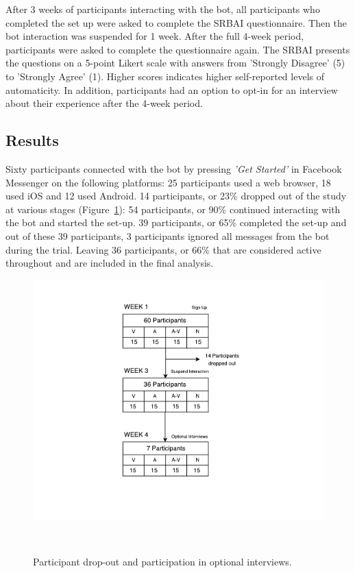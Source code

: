 After 3 weeks of participants interacting with the bot, all participants who completed the set up were asked to complete the SRBAI questionnaire. Then the bot interaction was suspended for 1 week. After the full 4-week period, participants were asked to complete the questionnaire again. The SRBAI presents the questions on a 5-point Likert scale with answers from 'Strongly Disagree' (5) to 'Strongly Agree' (1). Higher scores indicates higher self-reported levels of automaticity. In addition, participants had an option to opt-in for an interview about their experience after the 4-week period.

\subsection{Results}
Sixty participants connected with the bot by pressing \textit{'Get Started'} in Facebook Messenger on the following platforms: 25 participants used a web browser, 18 used iOS and 12 used Android. 14 participants, or 23\% dropped out of the study at various stages (Figure~\ref{fig:study_dropout}): 54 participants, or 90\% continued interacting with the bot and started the set-up. 39 participants, or 65\% completed the set-up and out of these 39 participants, 3 participants ignored all messages from the bot during the trial. Leaving 36 participants, or 66\% that are considered active throughout and are included in the final analysis.

\begin{figure}[H]
  \centering
  \includegraphics[width=.9\columnwidth]{resources/figures/study-flow.pdf}
  \caption{Participant drop-out and participation in optional interviews.}~\label{fig:study_dropout}
\end{figure}



